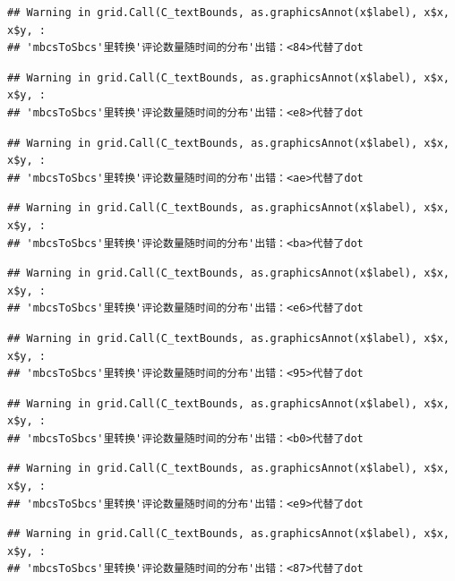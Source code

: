 \documentclass[
]{article}
\begin{document}
\begin{verbatim}
## Warning in grid.Call(C_textBounds, as.graphicsAnnot(x$label), x$x, x$y, :
## 'mbcsToSbcs'里转换'评论数量随时间的分布'出错：<84>代替了dot
\end{verbatim}

\begin{verbatim}
## Warning in grid.Call(C_textBounds, as.graphicsAnnot(x$label), x$x, x$y, :
## 'mbcsToSbcs'里转换'评论数量随时间的分布'出错：<e8>代替了dot
\end{verbatim}

\begin{verbatim}
## Warning in grid.Call(C_textBounds, as.graphicsAnnot(x$label), x$x, x$y, :
## 'mbcsToSbcs'里转换'评论数量随时间的分布'出错：<ae>代替了dot
\end{verbatim}

\begin{verbatim}
## Warning in grid.Call(C_textBounds, as.graphicsAnnot(x$label), x$x, x$y, :
## 'mbcsToSbcs'里转换'评论数量随时间的分布'出错：<ba>代替了dot
\end{verbatim}

\begin{verbatim}
## Warning in grid.Call(C_textBounds, as.graphicsAnnot(x$label), x$x, x$y, :
## 'mbcsToSbcs'里转换'评论数量随时间的分布'出错：<e6>代替了dot
\end{verbatim}

\begin{verbatim}
## Warning in grid.Call(C_textBounds, as.graphicsAnnot(x$label), x$x, x$y, :
## 'mbcsToSbcs'里转换'评论数量随时间的分布'出错：<95>代替了dot
\end{verbatim}

\begin{verbatim}
## Warning in grid.Call(C_textBounds, as.graphicsAnnot(x$label), x$x, x$y, :
## 'mbcsToSbcs'里转换'评论数量随时间的分布'出错：<b0>代替了dot
\end{verbatim}

\begin{verbatim}
## Warning in grid.Call(C_textBounds, as.graphicsAnnot(x$label), x$x, x$y, :
## 'mbcsToSbcs'里转换'评论数量随时间的分布'出错：<e9>代替了dot
\end{verbatim}

\begin{verbatim}
## Warning in grid.Call(C_textBounds, as.graphicsAnnot(x$label), x$x, x$y, :
## 'mbcsToSbcs'里转换'评论数量随时间的分布'出错：<87>代替了dot
\end{verbatim}
\end{document}
